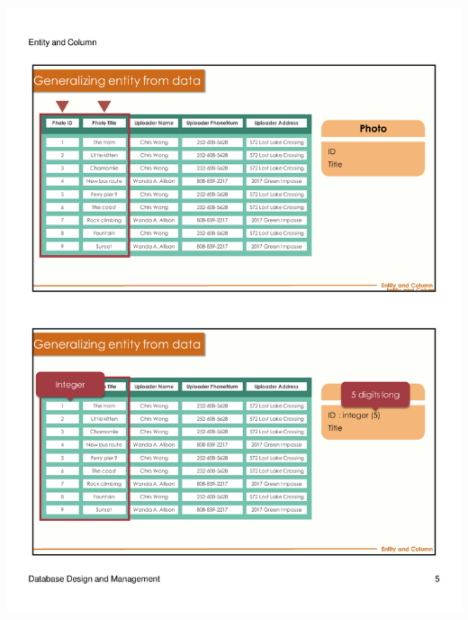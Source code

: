 \begin{frame}{ }
    \centering
    \includegraphics[width=\textwidth, trim={10mm 134mm 10mm 22mm}, clip]{resources/02/02_5}
\end{frame}
